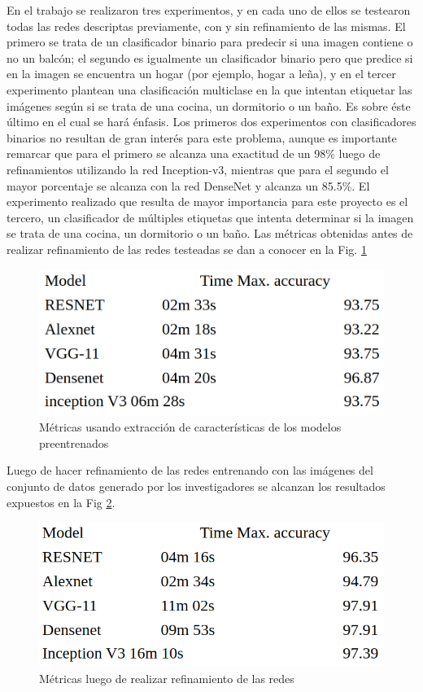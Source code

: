 En el trabajo se realizaron tres experimentos, y en cada uno de ellos se testearon todas las redes descriptas previamente, con y sin refinamiento de las mismas. El primero se trata de un clasificador binario para predecir si una imagen contiene o no un balcón; el segundo es igualmente un clasificador binario pero que predice si en la imagen se encuentra un hogar (por ejemplo, hogar a leña), y en el tercer experimento plantean una clasificación multiclase en la que intentan etiquetar las imágenes según si se trata de una cocina, un dormitorio o un baño. Es sobre éste último en el cual se hará énfasis. 
Los primeros dos experimentos con clasificadores binarios no resultan de gran interés para este problema, aunque es importante remarcar que para el primero se alcanza una exactitud de un 98\% luego de refinamientos utilizando la red Inception-v3, mientras que para el segundo el mayor porcentaje se alcanza con la red DenseNet y alcanza un 85.5\%. 
El experimento realizado que resulta de mayor importancia para este proyecto es el tercero, un clasificador de múltiples etiquetas que intenta determinar si la imagen se trata de una cocina, un dormitorio o un baño. Las métricas obtenidas antes de realizar refinamiento de las redes testeadas se dan a conocer en la Fig. \ref{fig:metricstransferlearning}
\begin{figure}[h!]
	\centering
	\includegraphics[width=0.6\linewidth]{images/metrics_transfer_learning}
	\caption[metrics_transfer_learning]{Métricas usando extracción de características de los modelos preentrenados}
	\label{fig:metricstransferlearning}
\end{figure}
Luego de hacer refinamiento de las redes entrenando con las imágenes del conjunto de datos generado por los investigadores se alcanzan los resultados expuestos en la Fig \ref{fig:metricstransferlearningfinetunned}.

\begin{figure}[h!]
	\centering
	\includegraphics[width=0.7\linewidth]{images/metrics_transfer_learning_fine_tunned}
	\caption[metricstransferlearningfinetunned]{Métricas luego de realizar refinamiento de las redes}
	\label{fig:metricstransferlearningfinetunned}
\end{figure}

